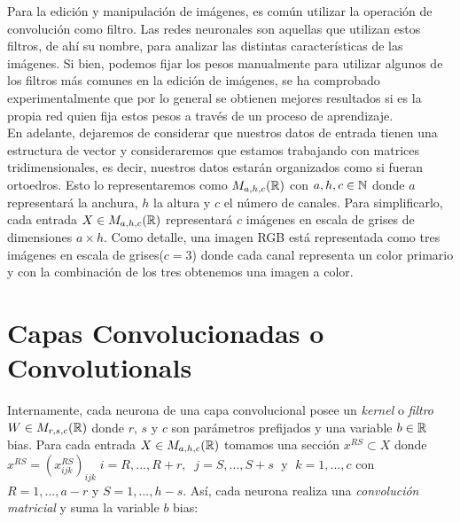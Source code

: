 Para la edición y manipulación de imágenes, es común utilizar la operación de convolución como filtro. Las redes neuronales son aquellas que utilizan estos filtros, de ahí su nombre, para analizar las distintas características de las imágenes. Si bien, podemos fijar los pesos manualmente para utilizar algunos de los filtros más comunes en la edición de imágenes, se ha comprobado experimentalmente que por lo general se obtienen mejores resultados si es la propia red quien fija estos pesos a través de un proceso de aprendizaje.\\


En adelante, dejaremos de considerar que nuestros datos de entrada tienen una estructura de vector y consideraremos que estamos trabajando con matrices tridimensionales, es decir, nuestros datos estarán organizados como si fueran ortoedros. Esto lo representaremos como $M_{a,h,c}(\mathbb{R})$ con $a,h,c\in \mathbb{N}$ donde $a$ representará la anchura, $h$ la altura y $c$ el número de canales. Para simplificarlo, cada entrada $X\in M_{a,h,c}(\mathbb{R})$ representará $c$ imágenes en escala de grises de dimensiones $a\times h$. Como detalle, una imagen RGB está representada como tres imágenes en escala de grises($c=3$) donde cada canal representa un color primario y con la combinación de los tres obtenemos una imagen a color.

\section{Capas Convolucionadas o Convolutionals}

Internamente, cada neurona de una capa convolucional posee un \emph{kernel} o \emph{filtro} $W\in M_{r,s,c}(\mathbb{R})$ donde $r$, $s$ y $c$ son parámetros prefijados y una variable $b\in\mathbb{R}$ bias. Para cada entrada $X \in M_{a,h,c}(\mathbb{R})$ tomamos una sección $x^{RS} \subset X$ donde $x^{RS}=(x_{ijk}^{RS})_{ijk}\; i=R,...,R+r, \;\; j=S,...,S+s\;$ y $\;k=1,...,c$ con $R=1,...,a-r$ y $S=1,...,h-s$. Así, cada neurona realiza una \emph{convolución matricial} y suma la variable $b$ bias: \newline

